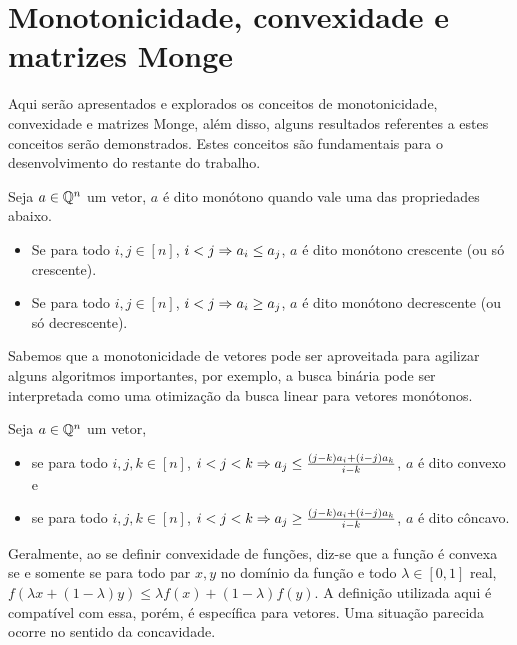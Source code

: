 \section{Monotonicidade, convexidade e matrizes Monge}
\label{MatrizMonge}


Aqui serão apresentados e explorados os conceitos de monotonicidade, convexidade e matrizes Monge, além disso, alguns resultados referentes a estes conceitos serão demonstrados. Estes conceitos são fundamentais para o desenvolvimento do restante do trabalho.

\begin{defi}
Seja $a \in \mathbb{Q}^n$ um vetor, $a$ é dito monótono quando vale uma das propriedades abaixo.
    \begin{itemize}
        \item Se para todo $i,j \in [n]$, $i < j \Rightarrow a_i \leq a_j$, $a$ é dito monótono crescente (ou só crescente).
        \item Se para todo $i,j \in [n]$, $i < j \Rightarrow a_i \geq a_j$, $a$ é dito monótono decrescente (ou só decrescente).
    \end{itemize}
\end{defi}

Sabemos que a monotonicidade de vetores pode ser aproveitada para agilizar alguns algoritmos importantes, por exemplo, a busca binária pode ser interpretada como uma otimização da busca linear para vetores monótonos. 

\begin{defi}
Seja $a \in \mathbb{Q}^n$ um vetor,
    \begin{itemize}
        \item se para todo $i,j,k \in [n]$, $i < j < k \Rightarrow a_j \leq \frac{(j-k)a_i + (i-j)a_k}{i-k}$, $a$ é dito convexo e
        \item se para todo $i,j,k \in [n]$, $i < j < k \Rightarrow a_j \geq \frac{(j-k)a_i + (i-j)a_k}{i-k}$, $a$ é dito côncavo.
    \end{itemize}
\end{defi}

Geralmente, ao se definir convexidade de funções, diz-se que a função é convexa se e somente se para todo par $x,y$ no domínio da função e todo $\lambda \in [0,1]$ real, $f(\lambda x + (1 - \lambda)y) \leq \lambda f(x) + (1 - \lambda) f(y)$. A definição utilizada aqui é compatível com essa, porém, é específica para vetores. Uma situação parecida ocorre no sentido da concavidade.

